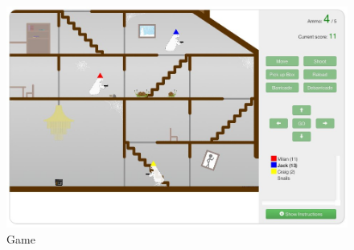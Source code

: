 \documentclass{article}
\begin{document}
\begin{figure}[htb]
\centering
\includegraphics[width=1.0\textwidth]{game-3.jpg}
\caption{Game}
\end{figure}
\end{document}
